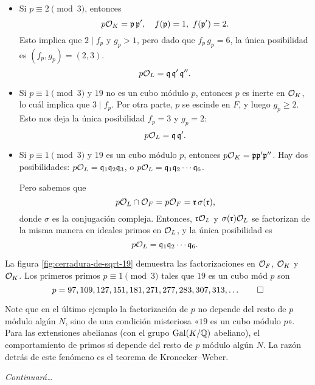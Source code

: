 \begin{ejemplo}
  \begin{itemize}
  \item Si $p \equiv 2 \pmod{3}$, entonces
    \[ p\mathcal{O}_K = \mathfrak{p}\,\mathfrak{p}', \quad
       f (\mathfrak{p}) = 1, ~ f (\mathfrak{p}') = 2. \]
    Esto implica que $2 \mid f_p$ y $g_p > 1$, pero dado que $f_p\,g_p = 6$,
    la única posibilidad es $(f_p,g_p) = (2,3)$.
    $$p\mathcal{O}_L = \mathfrak{q}\,\mathfrak{q}'\,\mathfrak{q}''.$$

  \item Si $p \equiv 1 \pmod{3}$ y $19$ no es un cubo módulo $p$, entonces
    $p$ es inerte en $\mathcal{O}_K$, lo cuál implica que $3 \mid f_p$. Por otra parte,
    $p$ se escinde en $F$, y luego $g_p \ge 2$. Esto nos deja la única
    posibilidad $f_p = 3$ y $g_p = 2$:
    $$p\mathcal{O}_L = \mathfrak{q}\,\mathfrak{q}'.$$

  \item Si $p \equiv 1\pmod{3}$ y $19$ es un cubo módulo $p$, entonces
    $p\mathcal{O}_K = \mathfrak{p} \mathfrak{p}' \mathfrak{p}''$.
    Hay dos posibilidades:
    $p\mathcal{O}_L = \mathfrak{q}_1 \mathfrak{q}_2 \mathfrak{q}_3$,
    o
    $p\mathcal{O}_L = \mathfrak{q}_1 \mathfrak{q}_2 \cdots \mathfrak{q}_6$.

    Pero sabemos que
    $$p\mathcal{O}_L \cap \mathcal{O}_F = p\mathcal{O}_F = \mathfrak{r}\,\sigma (\mathfrak{r}),$$
    donde $\sigma$ es la conjugación compleja. Entonces, $\mathfrak{r}\mathcal{O}_L$
    y $\sigma (\mathfrak{r})\mathcal{O}_L$ se factorizan de la misma manera en
    ideales primos en $\mathcal{O}_L$, y la única posibilidad es
    $$p\mathcal{O}_L = \mathfrak{q}_1 \mathfrak{q}_2 \cdots \mathfrak{q}_6.$$
  \end{itemize}

  La figura \ref{fig:cerradura-de-sqrt-19} demuestra las factorizaciones en
  $\mathcal{O}_F$, $\mathcal{O}_K$ y $\mathcal{O}_K$. Los primeros primos $p \equiv 1 \pmod{3}$ tales que
  $19$ es un cubo mód $p$ son
  \[ p = 97, 109, 127, 151, 181, 271, 277, 283, 307, 313, \ldots \qedhere \]
\end{ejemplo}

Note que en el último ejemplo la factorización de $p$ no depende del resto de
$p$ módulo algún $N$, sino de una condición misteriosa
«$19$ es un cubo módulo $p$». Para las extensiones abelianas (con el grupo
$\operatorname{Gal} (K/\mathbb{Q})$ abeliano), el comportamiento de primos sí depende del resto de
$p$ módulo algún $N$. La razón detrás de este fenómeno es el teorema de
Kronecker--Weber.

\vspace{1em}

\noindent\emph{Continuará\dots}

